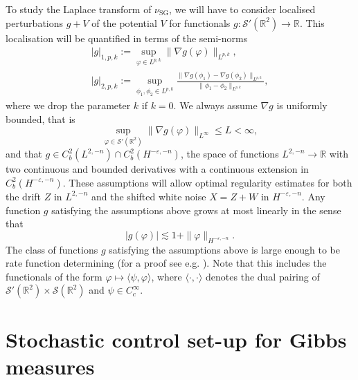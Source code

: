 \documentclass[11pt, a4paper]{scrartcl}
\numberwithin{equation}{section}
\theoremstyle{plain}
\theoremstyle{remark}
\newcommand{\assign}{:=}
\newcommand{\tmop}[1]{\ensuremath{\operatorname{#1}}}
\begin{document}
To study the Laplace transform of $\nu_{\tmop{SG}}$, we will have to consider
localised perturbations $g + V$ of the potential $V$ for functionals $g :
\mathcal{S}' (\mathbb{R}^2) \rightarrow \mathbb{R}$. This localisation will be
quantified in terms of the semi-norms
\[ \begin{aligned}
     | g |_{1, p, k} \assign \sup_{\varphi \in L^{p, k}} \| \nabla g (\varphi)
     \|_{L^{p, k}},\\
     | g |_{2, p, k} \assign \sup_{\phi_1, \phi_2 \in L^{p, k}}  \frac{\|
     \nabla g (\phi_1) - \nabla g (\phi_2) \|_{L^{p, k}}}{\| \phi_1 - \phi_2
     \|_{L^{p, k}}},
   \end{aligned}\]
where we drop the parameter $k$ if $k = 0$. We always assume $\nabla g$ is
uniformly bounded, that is
\[ \sup_{\varphi \in \mathcal{S}' (\mathbb{R}^2)} \| \nabla g (\varphi)
   \|_{L^{\infty}} \leqslant L < \infty, \]
and that $g \in C^2_b (L^{2, - n}) \cap C^2_b (H^{- \varepsilon, - n})$, the
space of functions $L^{2, - n} \rightarrow \mathbb{R}$ with two continuous and
bounded derivatives with a continuous extension in $C^2_b (H^{- \varepsilon, -
n})$. These assumptions will allow optimal regularity estimates for both the
drift $Z$ in $L^{2, - n}$ and the shifted white noise $X = Z + W$ in $H^{-
\varepsilon, - n}$. Any function $g$ satisfying the assumptions above grows at
most linearly in the sense that
\begin{equation}
  | g (\varphi) | \lesssim 1 + \| \varphi \|_{H^{-
  \varepsilon, - n}} . \label{eq:f-linear-growth}
\end{equation}
The class of functions $g$ satisfying the assumptions above is large enough to
be rate function determining (for a proof see e.g. {\cite[Lemma
9]{barashkovStochasticControlApproach2022}}). Note that this includes the
functionals of the form $\varphi \mapsto \langle \psi, \varphi \rangle$, where
$\langle \cdot, \cdot \rangle$ denotes the dual pairing of $\mathcal{S}'
(\mathbb{R}^2) \times \mathcal{S} (\mathbb{R}^2)$ and $\psi \in C^{\infty}_c
$.


\section{ Stochastic control set-up for Gibbs measures}\label{sec:CP}
\end{document}
